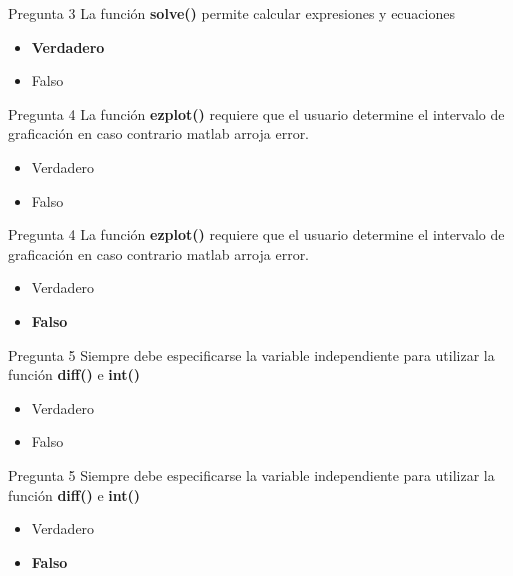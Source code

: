\documentclass{bredelebeamer}
\begin{document}
\begin{frame}{Pregunta 3}
La función \textbf{solve()} permite calcular expresiones y ecuaciones
\begin{itemize}
\item \textbf{Verdadero}
\item Falso
\end{itemize}
\end{frame}

\begin{frame}{Pregunta 4}
La función \textbf{ezplot()} requiere que el usuario determine el intervalo de graficación en caso contrario matlab arroja error.
\begin{itemize}
\item Verdadero
\item Falso
\end{itemize}
\end{frame}

\begin{frame}{Pregunta 4}
La función \textbf{ezplot()} requiere que el usuario determine el intervalo de graficación en caso contrario matlab arroja error.
\begin{itemize}
\item Verdadero
\item \textbf{Falso}
\end{itemize}
\end{frame}

\begin{frame}{Pregunta 5}
Siempre debe especificarse la variable independiente para utilizar la función \textbf{diff()} e \textbf{int()}
\begin{itemize}
\item Verdadero
\item Falso
\end{itemize}
\end{frame}

\begin{frame}{Pregunta 5}
Siempre debe especificarse la variable independiente para utilizar la función \textbf{diff()} e \textbf{int()}
\begin{itemize}
\item Verdadero
\item \textbf{Falso}
\end{itemize}
\end{frame}
\end{document}
